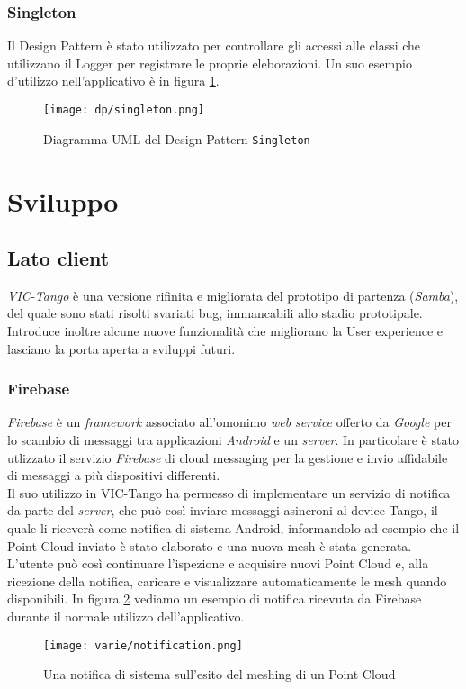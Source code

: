 \subsubsection{Singleton}
Il Design Pattern è stato utilizzato per controllare gli accessi alle classi che utilizzano il Logger per registrare le proprie eleborazioni. Un suo esempio d'utilizzo nell'applicativo è in figura \ref{fig:singleton}.
\begin{figure}[!h] 
    \centering 
    \texttt{[image: dp/singleton.png]} 
    \caption{Diagramma UML del Design Pattern \texttt{Singleton}}
   \label{fig:singleton}
\end{figure}
\newline

\section{Sviluppo}

\subsection{Lato client}
\emph{VIC-Tango} è una versione rifinita e migliorata del prototipo di partenza (\emph{Samba}), del quale sono stati risolti svariati bug, immancabili allo stadio prototipale. Introduce inoltre alcune nuove funzionalità che migliorano la User experience e lasciano la porta aperta a sviluppi futuri.

\subsubsection{Firebase}
\emph{Firebase} è un \emph{framework} associato all'omonimo \emph{web service} offerto da \emph{Google} per lo scambio di messaggi tra applicazioni \emph{Android} e un \emph{server}. In particolare è stato utlizzato il servizio \emph{Firebase} di cloud messaging per la gestione e invio affidabile di messaggi a più dispositivi differenti.\\ Il suo utilizzo in VIC-Tango ha permesso di implementare un servizio di notifica da parte del \emph{server}, che può così inviare messaggi asincroni al device Tango, il quale li riceverà come notifica di sistema Android, informandolo ad esempio che il Point Cloud inviato è stato elaborato e una nuova mesh è stata generata. L'utente può così continuare l'ispezione e acquisire nuovi Point Cloud e, alla ricezione della notifica, caricare e visualizzare automaticamente le mesh quando disponibili.
In figura \ref{fig:notification} vediamo un esempio di notifica ricevuta da Firebase durante il normale utilizzo dell'applicativo.
\begin{figure}[!h] 
    \centering 
    \texttt{[image: varie/notification.png]} 
    \caption{Una notifica di sistema sull'esito del meshing di un Point Cloud}
   \label{fig:notification}
\end{figure}
\newline


